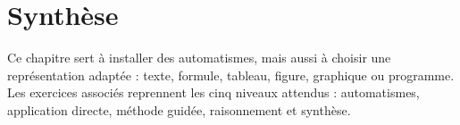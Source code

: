 \section{Synthèse}

Ce chapitre sert à installer des automatismes, mais aussi à choisir une représentation adaptée : texte, formule, tableau, figure, graphique ou programme. Les exercices associés reprennent les cinq niveaux attendus : automatismes, application directe, méthode guidée, raisonnement et synthèse.
